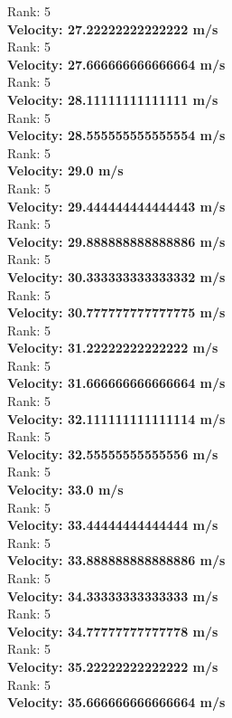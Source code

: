 \documentclass{article}
\begin{document}
Rank: 5\\
\textbf{Velocity: 27.22222222222222 m/s}\\
Rank: 5\\
\textbf{Velocity: 27.666666666666664 m/s}\\
Rank: 5\\
\textbf{Velocity: 28.11111111111111 m/s}\\
Rank: 5\\
\textbf{Velocity: 28.555555555555554 m/s}\\
Rank: 5\\
\textbf{Velocity: 29.0 m/s}\\
Rank: 5\\
\textbf{Velocity: 29.444444444444443 m/s}\\
Rank: 5\\
\textbf{Velocity: 29.888888888888886 m/s}\\
Rank: 5\\
\textbf{Velocity: 30.333333333333332 m/s}\\
Rank: 5\\
\textbf{Velocity: 30.777777777777775 m/s}\\
Rank: 5\\
\textbf{Velocity: 31.22222222222222 m/s}\\
Rank: 5\\
\textbf{Velocity: 31.666666666666664 m/s}\\
Rank: 5\\
\textbf{Velocity: 32.111111111111114 m/s}\\
Rank: 5\\
\textbf{Velocity: 32.55555555555556 m/s}\\
Rank: 5\\
\textbf{Velocity: 33.0 m/s}\\
Rank: 5\\
\textbf{Velocity: 33.44444444444444 m/s}\\
Rank: 5\\
\textbf{Velocity: 33.888888888888886 m/s}\\
Rank: 5\\
\textbf{Velocity: 34.33333333333333 m/s}\\
Rank: 5\\
\textbf{Velocity: 34.77777777777778 m/s}\\
Rank: 5\\
\textbf{Velocity: 35.22222222222222 m/s}\\
Rank: 5\\
\textbf{Velocity: 35.666666666666664 m/s}\\
\end{document}
